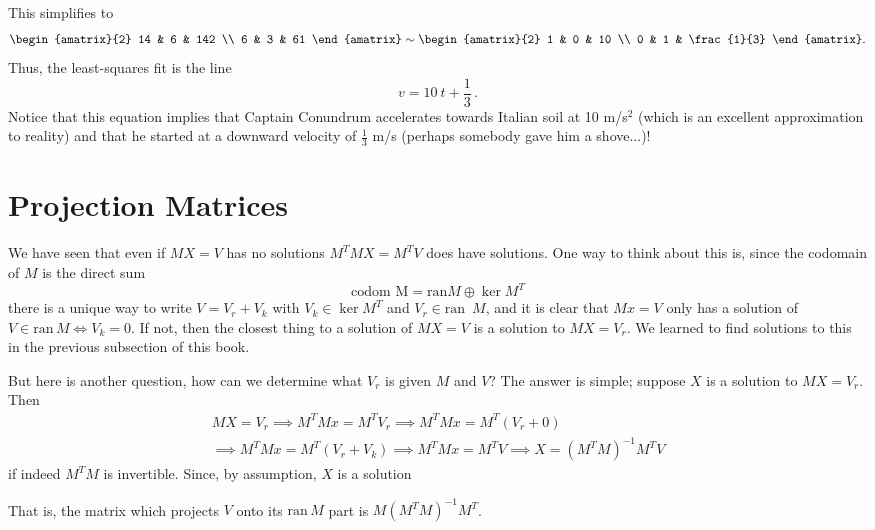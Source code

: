 \begin{example}
\[\]
This simplifies to 
\[
\begin{amatrix}{2}
14 & 6 & 142 \\
6 & 3 & 61
\end{amatrix}
\sim
\begin{amatrix}{2}
1 & 0 & 10 \\
0 & 1 & \frac{1}{3}
\end{amatrix}.
\]
Thus, the least-squares fit is the line
\[
v = 10\ t + \frac{1}{3}\, .
\]
Notice that this equation implies that Captain Conundrum accelerates towards Italian soil at 10 m/s$^2$ (which is an excellent
approximation to reality) and that he started at a downward velocity of $\frac13$ m/s (perhaps somebody gave him a shove...)!

\end{example}

\section{Projection Matrices}
We have seen that even if $MX=V$ has no solutions $M^TMX=M^T V$ does have solutions. One way to think about this is, since the codomain of $M$ is the direct sum 
\[ \text{codom M}=\text{ran} M \oplus \ker M^T\] 
there is a unique way to write  $V=V_r+V_k$ with $V_k\in \ker M^T$ and $V_r\in \text{ran }\, M$, and it is clear that $Mx=V$ only has a solution of 
$V\in \text{ran}\, M \Leftrightarrow V_k=0$. If not, then the closest thing to a solution of $MX=V$ is a solution to $MX=V_r$. We learned to find solutions to this in the previous subsection of this book. 

But here is another question, how can we determine what $V_r$ is given $M$ and $V$? The answer is simple; suppose $X$ is a solution to $MX=V_r$. Then
\begin{gather*}  MX=V_r 
\implies M^TMx=M^T V_r 
\implies M^TMx=M^T (V_r + 0) \\
\implies M^TMx=M^T (V_r+V_k)
\implies M^TMx=M^T V 
\implies X=(M^TM)^{-1} M^T V 
\end{gather*}
if indeed $M^TM$ is invertible. Since, by assumption, $X$ is a solution \\
\begin{center}
\end{center}
That is, the matrix which projects $V$ onto its $\text{ran} \, M$ part is $M(M^TM)^{-1} M^T$. 

